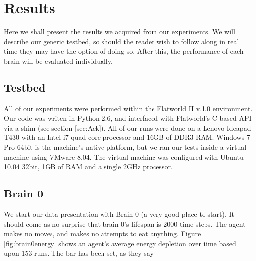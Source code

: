 \section{Results} \label{sec:Results}


Here we shall present the results we acquired from our experiments. We will
describe our generic testbed, so should the reader wish to follow along in
real time they may have the option of doing so. After this, the performance 
of each brain will be evaluated individually.

\subsection{Testbed}
All of our experiments were performed within the Flatworld II v.1.0 
environment. Our code was writen in Python 2.6, and interfaced with 
Flatworld's C-based API via a shim (see section \ref{sec:Ack}). All of our
runs were done on a Lenovo Ideapad T430 with an Intel i7 quad core processor
and 16GB of DDR3 RAM. Windows 7 Pro 64bit is the machine's native platform,
but we ran our tests inside a virtual machine using VMware 8.04. The virtual
machine was configured with Ubuntu 10.04 32bit, 1GB of RAM and a single 2GHz
processor.


\subsection{Brain 0}
We start our data presentation with Brain 0 (a very good place to start).
It should come as no surprise that brain 0's lifespan is 2000 time steps. 
The agent makes no moves, and makes no attempts to eat anything. 
Figure \ref{fig:brain0energy} shows an agent's average energy depletion over 
time based upon 153 runs. The bar has been set, as they say.

